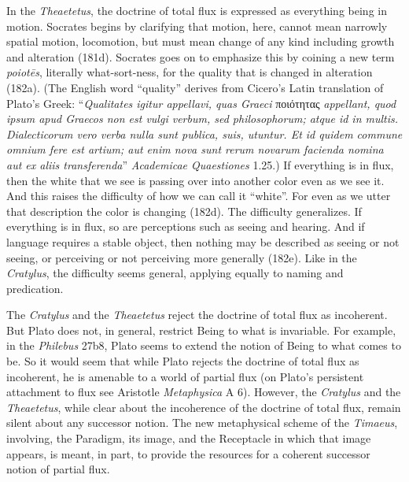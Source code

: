 
In the \emph{Theaetetus}, the doctrine of total flux is expressed as everything being in motion. Socrates begins by clarifying that motion, here, cannot mean narrowly spatial motion, locomotion, but must mean change of any kind including growth and alteration (181d). Socrates goes on to emphasize this by coining a new term \emph{poiotēs}, literally what-sort-ness, for the quality that is changed in alteration (182a). (The English word ``quality'' derives from Cicero's Latin translation of Plato's Greek: ``\emph{Qualitates igitur appellavi, quas Graeci} {\sbl ποιότητας} \emph{appellant, quod ipsum apud Graecos non est vulgi verbum, sed philosophorum; atque id in multis. Dialecticorum vero verba nulla sunt publica, suis, utuntur. Et id quidem commune omnium fere est artium; aut enim nova sunt rerum novarum facienda nomina aut ex aliis transferenda}'' \emph{Academicae Quaestiones} 1.25.) If everything is in flux, then the white that we see is passing over into another color even as we see it. And this raises the difficulty of how we can call it ``white''. For even as we utter that description the color is changing (182d). The difficulty generalizes. If everything is in flux, so are perceptions such as seeing and hearing. And if language requires a stable object, then nothing may be described as seeing or not seeing, or perceiving or not perceiving more generally (182e). Like in the \emph{Cratylus}, the difficulty seems general, applying equally to naming and predication.

The \emph{Cratylus} and the \emph{Theaetetus} reject the doctrine of total flux as incoherent. But Plato does not, in general, restrict Being to what is invariable. For example, in the \emph{Philebus} 27b8, Plato seems to extend the notion of Being to what comes to be. So it would seem that while Plato rejects the doctrine of total flux as incoherent, he is amenable to a world of partial flux (on Plato's persistent attachment to flux see Aristotle \emph{Metaphysica} A 6). However, the \emph{Cratylus} and the \emph{Theaetetus}, while clear about the incoherence of the doctrine of total flux, remain silent about any successor notion. The new metaphysical scheme of the \emph{Timaeus}, involving, the Paradigm, its image, and the Receptacle in which that image appears, is meant, in part, to provide the resources for a coherent successor notion of partial flux.

